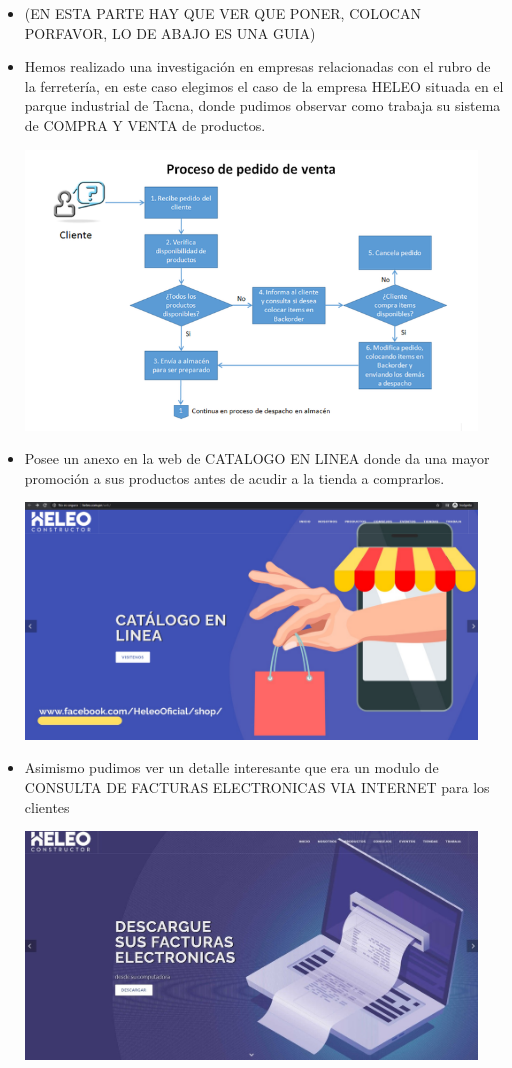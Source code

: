\documentclass[preprint,12pt]{elsarticle}
\begin{document}
\begin{itemize} 
 \item (EN ESTA PARTE HAY QUE VER QUE PONER, COLOCAN PORFAVOR, LO DE ABAJO ES UNA GUIA)

    \item Hemos realizado una investigación en empresas relacionadas con el rubro de la ferretería, en este caso elegimos el caso de la empresa HELEO situada en el parque industrial de Tacna, donde pudimos observar como trabaja su sistema de COMPRA Y VENTA de productos.
	\begin{center}
	\includegraphics[width=12cm]{./imagen/1} 
	\end{center}
	\item Posee un anexo en la web de CATALOGO EN LINEA donde da una mayor promoción a sus productos antes de acudir a la tienda a comprarlos.
	\begin{center}
	\includegraphics[width=12cm]{./imagen/2} 
	\end{center}
	\item Asimismo pudimos ver un detalle interesante que era un modulo de CONSULTA DE FACTURAS ELECTRONICAS VIA INTERNET para los clientes
	\begin{center}
	\includegraphics[width=12cm]{./imagen/3} 
	\end{center}
\end{itemize}
\end{document}
